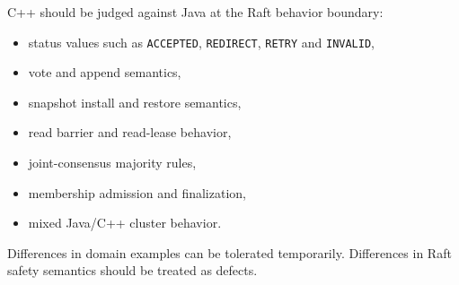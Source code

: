C++ should be judged against Java at the Raft behavior boundary:

\begin{itemize}
\item status values such as \texttt{ACCEPTED}, \texttt{REDIRECT}, \texttt{RETRY}
and \texttt{INVALID},
\item vote and append semantics,
\item snapshot install and restore semantics,
\item read barrier and read-lease behavior,
\item joint-consensus majority rules,
\item membership admission and finalization,
\item mixed Java/C++ cluster behavior.
\end{itemize}

Differences in domain examples can be tolerated temporarily. Differences in
Raft safety semantics should be treated as defects.
